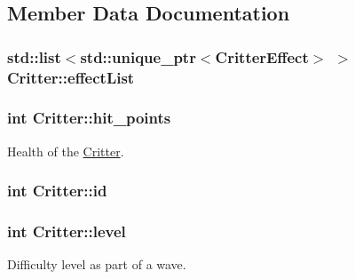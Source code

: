 \subsection{Member Data Documentation}
\hypertarget{class_critter_a9974fdc5dd5ef5afc8ff2fffbd2261e0}{
\subsubsection[{effect\+List}]{\setlength{\rightskip}{0pt plus 5cm}std\+::list$<$std\+::unique\+\_\+ptr$<${\bf Critter\+Effect}$>$ $>$ Critter\+::effect\+List\hspace{0.3cm}{\ttfamily [protected]}}}\label{class_critter_a9974fdc5dd5ef5afc8ff2fffbd2261e0}
\hypertarget{class_critter_a916038a11e8443ea403a644e91fc791e}{
\subsubsection[{hit\+\_\+points}]{\setlength{\rightskip}{0pt plus 5cm}int Critter\+::hit\+\_\+points\hspace{0.3cm}{\ttfamily [protected]}}}\label{class_critter_a916038a11e8443ea403a644e91fc791e}


Health of the \hyperlink{class_critter}{Critter}. 

\hypertarget{class_critter_ae775e0ebe6e8bbe249c403670bda46f8}{
\subsubsection[{id}]{\setlength{\rightskip}{0pt plus 5cm}int Critter\+::id\hspace{0.3cm}{\ttfamily [protected]}}}\label{class_critter_ae775e0ebe6e8bbe249c403670bda46f8}
\hypertarget{class_critter_a9f9a6408a55212036f317710dc3da410}{
\subsubsection[{level}]{\setlength{\rightskip}{0pt plus 5cm}int Critter\+::level\hspace{0.3cm}{\ttfamily [protected]}}}\label{class_critter_a9f9a6408a55212036f317710dc3da410}


Difficulty level as part of a wave. 


